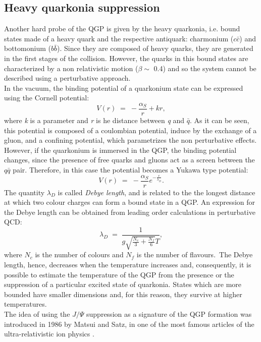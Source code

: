 \subsection{Heavy quarkonia suppression}
Another hard probe of the QGP is given by the heavy quarkonia, i.e. bound states made of a heavy quark and the respective antiquark: charmonium ($c\bar{c}$) and bottomonium ($b\bar{b}$). Since they are composed of heavy quarks, they are generated in the first stages of the collision. However, the quarks in this bound states are characterized by a non relativistic motion ($\beta\sim$ 0.4) and so the system cannot be described using a perturbative approach.\\
In the vacuum, the binding potential of a quarkonium state can be expressed using the Cornell potential:
\begin{equation}
 V(r)\;=\;-\frac{\alpha_{S}}{r}+kr,
\end{equation}
where \textit{k} is a parameter and \textit{r} is he distance between \textit{q} and $\bar{q}$.
As it can be seen, this potential is composed of a coulombian potential, induce by the exchange of a gluon, and a confining potential, which parametrizes the non perturbative effects.\\
However, if the quarkonium is immersed in the QGP, the binding potential changes, since the presence of free quarks and gluons act as a screen between the $q\bar{q}$ pair. Therefore, in this case the potential becomes a Yukawa type potential:
\begin{equation}
 V(r)\;=\;-\frac{\alpha_{S}}{r}e^{-\frac{r}{\lambda_{D}}}.
\end{equation}
The quantity $\lambda_{D}$ is called \textit{Debye length}, and is related to the the longest distance at which two colour charges can form a bound state in a QGP. An expression for the Debye length can be obtained from leading order calculations in perturbative QCD:
\begin{equation}
 \lambda_{D}\;=\;\frac{1}{g\sqrt{\frac{N_{c}}{3}+\frac{N_{f}}{6}}T},
\end{equation}
where $N_{c}$ is the number of colours and $N_{f}$ is the number of flavours.\
The Debye length, hence, decreases when the temperature increases and, consequently, it is possible to estimate the temperature of the QGP from the presence or the suppression of a particular excited state of quarkonia. States which are more bounded have smaller dimensions and, for this reason, they survive at higher temperatures.\\
The idea of using the $J/\Psi$ suppression as a signature of the QGP formation was introduced in 1986 by Matsui and Satz, in one of the most famous articles of the ultra-relativistic ion physics \cite{matsui}.\\

